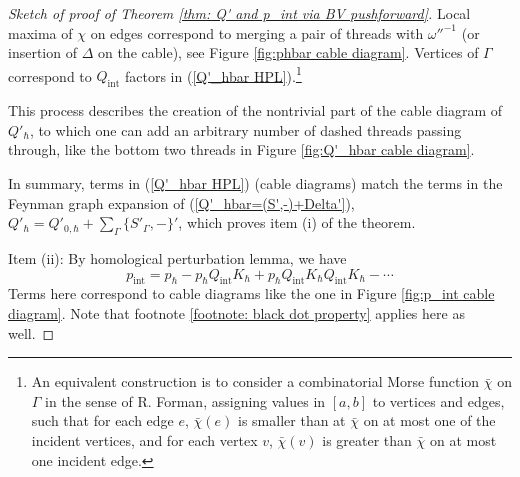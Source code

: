 \documentclass{amsart}
\theoremstyle{plain} %
\theoremstyle{definition}
\theoremstyle{remark}
\newcommand{\ii}{\mathrm{int}}
\begin{document}
\begin{proof}[Sketch of proof of Theorem \ref{thm: Q' and p_int via BV pushforward}]
Local maxima of $\chi$ on edges correspond to merging a pair of threads with  $\omega''^{-1}$  (or insertion of $\Delta$ on the cable), see Figure \ref{fig:phbar cable diagram}.  Vertices of $\Gamma$ correspond to $Q_\ii$ factors in (\ref{Q'_hbar HPL}).\footnote{
An equivalent construction is to 
consider a combinatorial Morse function $\bar\chi$ on $\Gamma$ in the sense of R. Forman, assigning values in $[a,b]$ to vertices and edges, such that for each edge $e$,  $\bar\chi(e)$ is smaller than at $\bar\chi$ on at most one of the incident vertices, and for each vertex $v$, $\bar\chi(v)$ is greater than $\bar\chi$ on at most one incident edge.
}

This process describes the creation of the nontrivial part of the cable diagram of $Q'_\hbar$, to which one can add an arbitrary number of dashed threads passing through, like the bottom two threads in Figure \ref{fig:Q'_hbar cable diagram}.


In summary, terms in (\ref{Q'_hbar HPL}) (cable diagrams) match the terms in the Feynman graph expansion of (\ref{Q'_hbar=(S',-)+Delta'}), $Q'_\hbar=Q'_{0,\hbar}+\sum_\Gamma \{S'_\Gamma,-\}'$,  
which proves item (i) of the theorem.

Item (ii):
By homological perturbation lemma, we have 
\begin{equation}\label{p_int HPL}
    p_\ii=p_\hbar-p_\hbar Q_\ii K_\hbar+p_\hbar Q_\ii K_\hbar Q_\ii K_\hbar-\cdots
\end{equation}
Terms here correspond to cable diagrams like the one in Figure \ref{fig:p_int cable diagram}. Note that footnote \ref{footnote: black dot property} applies here as well.


\end{proof}
\end{document}
